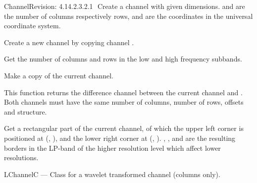 \begin{manpage}{\libtitle}{Channel}{$ $Revision: 4.14.2.3.2.1 $ $}
    Create a channel with given dimensions.  and  are the
    number of columns respectively rows,  and  are the
    coordinates in the universal coordinate system.

    Create a new channel by copying channel .


\subtitle{Public \\ Operations}

    Get the number of columns and rows in the low and high frequency subbands.


\subtitle{Virtual \\ Operations}

    Make a copy of the current channel.

    This function returns the difference channel between the current channel
    and . Both channels must have the same number of columns,
    number of rows, offsets and structure.

    Get a rectangular part of the current channel, of which the upper left
    corner is positioned at (, ), and the lower right corner
    at (, ). , ,  and
     are the resulting borders in the LP-band of the higher
    resolution level which affect lower resolutions.


\separator

\subtitle{Name}
    LChannelC --- Class for a wavelet transformed channel (columns only).



\end{manpage}
